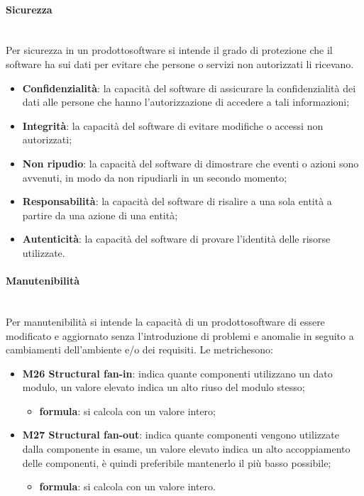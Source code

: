 	\paragraph{Sicurezza} \mbox{}\\
	Per sicurezza in un prodotto\glosp software si intende il grado di protezione che il software ha sui dati per evitare che persone o servizi non autorizzati li ricevano.
	\begin{itemize}
		\item \textbf{Confidenzialità}: la capacità del software di assicurare la confidenzialità dei dati alle persone che hanno l'autorizzazione di accedere a tali informazioni;
		\item \textbf{Integrità}: la capacità del software di evitare modifiche o accessi non autorizzati;
		\item \textbf{Non ripudio}: la capacità del software di dimostrare che eventi o azioni sono avvenuti, in modo da non ripudiarli in un secondo momento;
		\item \textbf{Responsabilità}: la capacità del software di risalire a una sola entità a partire da una azione di una entità;
		\item \textbf{Autenticità}: la capacità del software di provare l'identità delle risorse utilizzate.
	\end{itemize}

	\paragraph{Manutenibilità} \mbox{}\\[1mm]
	Per manutenibilità si intende la capacità di un prodotto\glosp software di essere modificato e aggiornato senza l'introduzione di problemi e anomalie in seguito a cambiamenti dell'ambiente e/o dei requisiti.
	Le metriche\glosp sono:
	\begin{itemize}
		\item \textbf{M26 Structural fan-in}: indica quante componenti utilizzano un dato modulo, un valore elevato indica un alto riuso del modulo stesso;
		\begin{itemize}
			\item[] \textbf{formula}: si calcola con un valore intero;
		\end{itemize}
		\item \textbf{M27 Structural fan-out}: indica quante componenti vengono utilizzate dalla componente in esame, un valore elevato indica un alto accoppiamento delle componenti, è quindi preferibile mantenerlo il più basso possibile;
		\begin{itemize}
			\item[] \textbf{formula}: si calcola con un valore intero.
		\end{itemize}
	\end{itemize}
